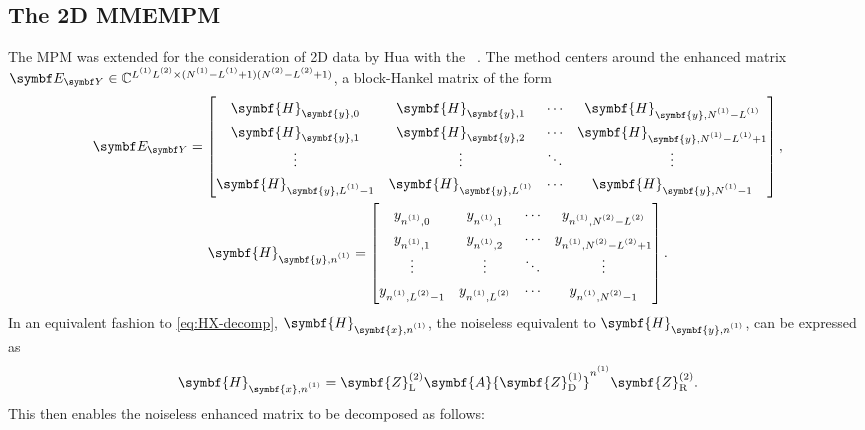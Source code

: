 \subsection{The 2D MMEMPM}
\label{subsec:mmempm}
The \ac{MPM} was extended for the consideration of \ac{2D} data by Hua with the
~\cite{Hua1992}. The method centers around the enhanced matrix $\EY
\in \mathbb{C}^{\Lone \Ltwo \times (\None - \Lone + 1)(\Ntwo - \Ltwo + 1)}$,
a block-Hankel matrix of the form
\begin{subequations}
    \begin{gather}
        \EY =
        \begin{bmatrix}
            \symbf{H}_{\symbf{y},0} & \symbf{H}_{\symbf{y},1} & \cdots & \symbf{H}_{\symbf{y},\None - \Lone} \\
            \symbf{H}_{\symbf{y},1} & \symbf{H}_{\symbf{y},2} & \cdots & \symbf{H}_{\symbf{y},\None - \Lone + 1} \\
            \vdots & \vdots & \ddots & \vdots \\
            \symbf{H}_{\symbf{y},\Lone - 1} & \symbf{H}_{\symbf{y},\Lone} & \cdots & \symbf{H}_{\symbf{y},\None - 1}
        \end{bmatrix}, \\
        \def\arraystretch{1.3}
        \symbf{H}_{\symbf{y},\none} =
        \begin{bmatrix}
            y_{ \none, 0 } & y_{ \none, 1 } & \cdots & y_{ \none, \Ntwo - \Ltwo } \\
            y_{ \none, 1 } & y_{ \none, 2 } & \cdots & y_{ \none, \Ntwo - \Ltwo + 1 } \\
            \vdots & \vdots & \ddots & \vdots \\
            y_{ \none, \Ltwo - 1 } & y_{ \none, \Ltwo } & \cdots & y_{ \none, \Ntwo - 1 }
        \end{bmatrix}.
    \end{gather}
\end{subequations}
In an equivalent fashion to \cref{eq:HX-decomp},
$\symbf{H}_{\symbf{x},\none}$, the noiseless equivalent to
$\symbf{H}_{\symbf{y},\none}$, can be expressed as
\begin{equation}
    \symbf{H}_{\symbf{x},\none} =
        \symbf{Z}^{(2)}_{\text{L}}
        \symbf{A}
        {\symbf{Z}^{(1)}_{\text{D}}}^{\none}
        \symbf{Z}^{(2)}_{\text{R}}.
\end{equation}
This then enables the noiseless enhanced matrix to be decomposed as follows:
